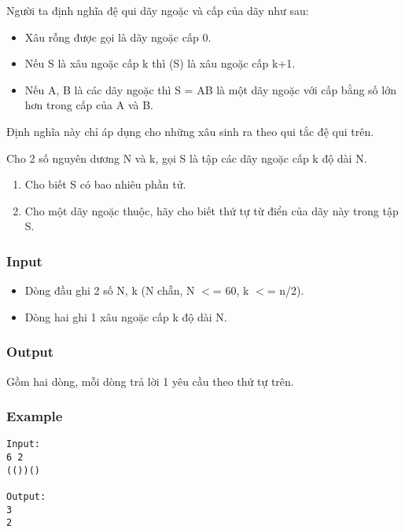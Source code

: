 

Người ta định nghĩa đệ qui dãy ngoặc và cấp của dãy như sau:
\begin{itemize}
	\item Xâu rỗng được gọi là dãy ngoặc cấp 0.
	\item Nếu S là xâu ngoặc cấp k thì (S) là xâu ngoặc cấp k+1.
	\item Nếu A, B là các dãy ngoặc thì S = AB là một dãy ngoặc với cấp bằng số lớn hơn trong cấp của A và B.
\end{itemize}

Định nghĩa này chỉ áp dụng cho những xâu sinh ra theo qui tắc đệ qui trên.

Cho 2 số nguyên dương N và k, gọi S là tập các dãy ngoặc cấp k độ dài N.
\begin{enumerate}
	\item Cho biết S có bao nhiêu phần tử.
	\item Cho một dãy ngoặc thuộc, hãy cho biết thứ tự từ điển của dãy này trong tập S.
\end{enumerate}

\subsubsection{Input}
\begin{itemize}
	\item Dòng đầu ghi 2 số N, k (N chẵn, N $<$= 60, k $<$= n/2).
	\item Dòng hai ghi 1 xâu ngoặc cấp k độ dài N.
\end{itemize}

\subsubsection{Output}

Gồm hai dòng, mỗi dòng trả lời 1 yêu cầu theo thứ tự trên.

\subsubsection{Example}
\begin{verbatim}
Input:
6 2
(())()

Output:
3
2
\end{verbatim}